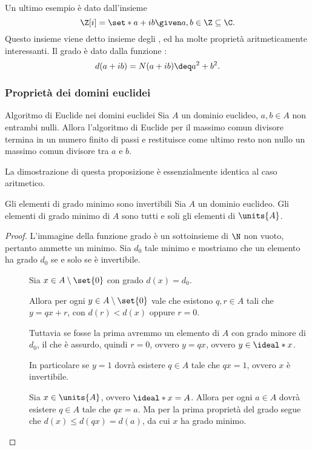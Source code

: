 Un ultimo esempio è dato dall'insieme \[
    \Z[i] = \set*{a + ib \given a, b \in \Z} \subseteq \C.    
\] Questo insieme viene detto insieme degli , ed ha molte proprietà aritmeticamente interessanti. Il grado è dato dalla funzione : \[
    d(a + ib) = N(a + ib) \deq a^2 + b^2.
\]

\subsubsection{Proprietà dei domini euclidei}

\begin{proposition}
    {Algoritmo di Euclide nei domini euclidei}{}
    Sia $A$ un dominio euclideo, $a, b \in A$ non entrambi nulli. Allora l'algoritmo di Euclide per il massimo comun divisore termina in un numero finito di passi e restituisce come ultimo resto non nullo un massimo comun divisore tra $a$ e $b$.
\end{proposition}
La dimostrazione di questa proposizione è essenzialmente identica al caso aritmetico.

\begin{proposition}
    {Gli elementi di grado minimo sono invertibili}
    Sia $A$ un dominio euclideo. Gli elementi di grado minimo di $A$ sono tutti e soli gli elementi di $\units{A}$.
\end{proposition}
\begin{proof}
    L'immagine della funzione grado è un sottoinsieme di $\N$ non vuoto, pertanto ammette un minimo. Sia $d_0$ tale minimo e mostriamo che un elemento ha grado $d_0$ se e solo se è invertibile.
    
    \begin{description}
        \item[\boximpl ] Sia $x \in A \setminus \set{0}$ con grado $d(x) = d_0$. 
        
        Allora per ogni $y \in A \setminus \set{0}$ vale che esistono $q, r \in A$ tali che $y = qx + r$, con $d(r) < d(x)$ oppure $r = 0$. 
        
        Tuttavia se fosse la prima avremmo un elemento di $A$ con grado minore di $d_0$, il che è assurdo, quindi $r = 0$, ovvero $y = qx$, ovvero $y \in \ideal*{x}$.

        In particolare se $y = 1$ dovrà esistere $q \in A$ tale che $qx = 1$, ovvero $x$ è invertibile.
        \item[\boximplby] Sia $x \in \units{A}$, ovvero $\ideal*{x} = A$. Allora per ogni $a \in A$ dovrà esistere $q \in A$ tale che $qx = a$. Ma per la prima proprietà del grado segue che $d(x) \leq d(qx) = d(a)$, da cui $x$ ha grado minimo. \qedhere
    \end{description}
\end{proof}

